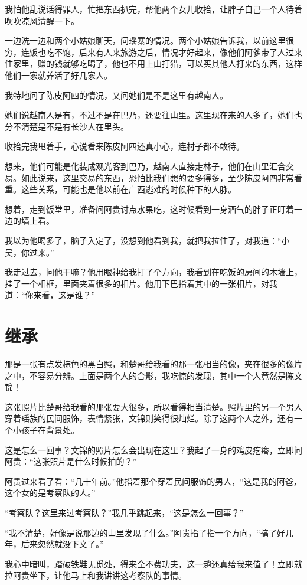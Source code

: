 我怕他乱说话得罪人，忙把东西扒完，帮他两个女儿收拾，让胖子自己一个人待着吹吹凉风清醒一下。

一边洗一边和两个小姑娘聊天，问瑶寨的情况。两个小姑娘告诉我，以前这里很穷，连饭也吃不饱，后来有人来旅游之后，情况才好起来，像他们阿爹带了人过来住家里，赚的钱就够吃喝了，他也不用上山打猎，可以买其他人打来的东西，这样他们一家就养活了好几家人。

我特地问了陈皮阿四的情况，又问她们是不是这里有越南人。

她们说越南人是有，不过不是在巴乃，还要往山里。这里现在来的人多了，她们也分不清楚是不是有长沙人在里头。

收拾完我甩着手，心说看来陈皮阿四还真小心，连村子都不敢待。

想来，他们可能是化装成观光客到巴乃，越南人直接走林子，他们在山里汇合交易。如此说来，这里交易的东西，恐怕比我们想的要多得多，至少陈皮阿四非常看重。这些关系，可能也是他以前在广西逃难的时候种下的人脉。

想着，走到饭堂里，准备问阿贵讨点水果吃，这时候看到一身酒气的胖子正盯着一边的墙上看。

我以为他喝多了，脑子入定了，没想到他看到我，就把我拉住了，对我道：“小吴，你过来。”

我走过去，问他干嘛？他用眼神给我打了个方向，我看到在吃饭的房间的木墙上，挂了一个相框，里面夹着很多的相片。他用下巴指着其中的一张相片，对我道：“你来看，这是谁？”

\chapter{继承}

那是一张有点发棕色的黑白照，和楚哥给我看的那一张相当的像，夹在很多的像片之中，不容易分辨。上面是两个人的合影，我吃惊的发现，其中一个人竟然是陈文锦！

这张照片比楚哥给我看的那张要大很多，所以看得相当清楚。照片里的另一个男人穿着瑶族的民间服饰，表情紧张，文锦则笑得很灿烂。除了这两个人之外，还有一个小孩子在背景处。

这是怎么一回事？文锦的照片怎么会出现在这里？我起了一身的鸡皮疙瘩，立即问阿贵：“这张照片是什么时候拍的？”

阿贵过来看了看：“几十年前。”他指着那个穿着民间服饰的男人，“这是我的阿爸，这个女的是考察队的人。”

“考察队？这里来过考察队？”我几乎跳起来，“这是怎么一回事？”

“我不清楚，好像是说那边的山里发现了什么。”阿贵指了指一个方向，“搞了好几年，后来忽然就没下文了。”

我心中暗叫，踏破铁鞋无觅处，得来全不费功夫，这一趟还真给我来值了！立即就拉阿贵坐下，让他马上和我讲讲这考察队的事情。

